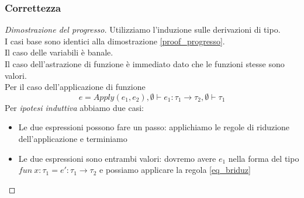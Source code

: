 \subsubsection{Correttezza}
\begin{proof}[Dimostrazione del progresso]
	Utilizziamo l'induzione sulle derivazioni di tipo.\\
	I casi base sono identici alla dimostrazione \ref{proof_progresso}.\\
	Il caso delle variabili è banale.\\
	Il caso dell'astrazione di funzione è immediato dato che le funzioni stesse sono valori.\\
	Per il caso dell'applicazione di funzione
	\begin{equation*}
		e = Apply(e_1,e_2), \emptyset \vdash e_1:\tau_1 \rightarrow \tau_2, \emptyset \vdash \tau_1
	\end{equation*}
	Per \textit{ipotesi induttiva} abbiamo due casi:
	\begin{itemize}
		\item Le due espressioni possono fare un passo: applichiamo le regole di riduzione dell'applicazione e terminiamo
		\item Le due espressioni sono entrambi valori: dovremo avere $e_1$ nella forma del tipo $fun \: x:\tau_1 = e':\tau_1 \rightarrow \tau_2$ e possiamo applicare la regola \ref{eq_briduz} 
	\end{itemize}
\end{proof}
